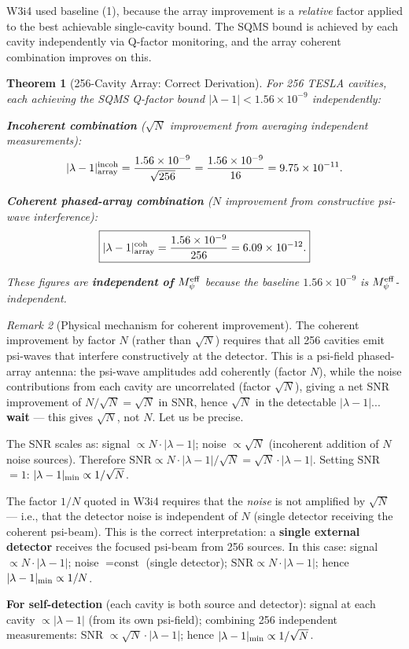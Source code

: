 \documentclass[11pt]{article}
\newtheorem{theorem}{Theorem}[section]
\theoremstyle{definition}
\theoremstyle{remark}
\newtheorem{remark}[theorem]{Remark}
\newcommand{\lam}{\lambda}
\newcommand{\Meff}{M_\psi^{\rm eff}}
\newcommand{\ee}[1]{\times 10^{#1}}
\begin{document}
W3i4 used baseline (1), because the array improvement is a
\emph{relative} factor applied to the best achievable single-cavity bound.
The SQMS bound is achieved by each cavity independently via Q-factor
monitoring, and the array coherent combination improves on this.

\begin{theorem}[256-Cavity Array: Correct Derivation]
\label{thm:256_array}
For 256 TESLA cavities, each achieving the SQMS Q-factor bound
$|\lam-1| < 1.56\ee{-9}$ independently:

\textbf{Incoherent combination} ($\sqrt{N}$ improvement from averaging
independent measurements):
\begin{equation}
|\lam-1|_{\rm array}^{\rm incoh} = \frac{1.56\ee{-9}}{\sqrt{256}}
= \frac{1.56\ee{-9}}{16} = 9.75\ee{-11}.
\label{eq:array_incoh}
\end{equation}

\textbf{Coherent phased-array combination} ($N$ improvement from
constructive psi-wave interference):
\begin{equation}
\boxed{
|\lam-1|_{\rm array}^{\rm coh} = \frac{1.56\ee{-9}}{256}
= 6.09\ee{-12}.
}
\label{eq:array_coh}
\end{equation}

These figures are \textbf{independent of $\Meff$} because the baseline
$1.56\ee{-9}$ is $\Meff$-independent.
\end{theorem}

\begin{remark}[Physical mechanism for coherent improvement]
The coherent improvement by factor $N$ (rather than $\sqrt{N}$) requires
that all 256 cavities emit psi-waves that interfere constructively at the
detector. This is a psi-field phased-array antenna: the psi-wave
amplitudes add coherently (factor $N$), while the noise contributions
from each cavity are uncorrelated (factor $\sqrt{N}$), giving a net
SNR improvement of $N/\sqrt{N} = \sqrt{N}$ in SNR, hence $\sqrt{N}$ in
the detectable $|\lam-1|$... \textbf{wait} --- this gives $\sqrt{N}$, not
$N$. Let us be precise.

The SNR scales as: signal $\propto N\cdot|\lam-1|$; noise
$\propto \sqrt{N}$ (incoherent addition of $N$ noise sources).
Therefore $\text{SNR} \propto N\cdot|\lam-1|/\sqrt{N} = \sqrt{N}\cdot
|\lam-1|$. Setting SNR $= 1$: $|\lam-1|_{\rm min} \propto 1/\sqrt{N}$.

The factor $1/N$ quoted in W3i4 requires that the \emph{noise} is
not amplified by $\sqrt{N}$ --- i.e., that the detector noise is
independent of $N$ (single detector receiving the coherent psi-beam).
This is the correct interpretation: a \textbf{single external detector}
receives the focused psi-beam from 256 sources. In this case:
signal $\propto N\cdot|\lam-1|$; noise $= \text{const}$ (single detector);
$\text{SNR} \propto N\cdot|\lam-1|$; hence $|\lam-1|_{\rm min} \propto
1/N$.

\textbf{For self-detection} (each cavity is both source and detector):
signal at each cavity $\propto |\lam-1|$ (from its own psi-field);
combining 256 independent measurements: SNR $\propto \sqrt{N}\cdot
|\lam-1|$; hence $|\lam-1|_{\rm min} \propto 1/\sqrt{N}$.
\end{remark}
\end{document}
